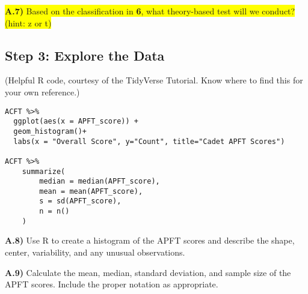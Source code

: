 \documentclass{article}
\newif\ifPrintSolution
\newcommand{\sol}[1]{\ifPrintSolution {\color{blue} #1 } \fi}
\begin{document}
\sol{Our variable of interest is APFT$\_$score, which is a quantitative variable.}

\vspace{0.2in}

\colorbox{yellow}{\textbf{A.7)} Based on the classification in \textbf{6}, what theory-based test will we conduct? (hint: z or t)}

\sol{A quantitative variable will conduct a single-mean test with the \textit{t} statistic.}

\subsection*{Step 3: Explore the Data}

(Helpful R code, courtesy of the TidyVerse Tutorial. Know where to find this for your own reference.) \color{blue}

\begin{verbatim}
ACFT %>% 
  ggplot(aes(x = APFT_score)) +
  geom_histogram()+
  labs(x = "Overall Score", y="Count", title="Cadet APFT Scores")

ACFT %>% 
    summarize(
        median = median(APFT_score),
        mean = mean(APFT_score),
        s = sd(APFT_score),
        n = n()
    )
    \end{verbatim}
\color{black}

\textbf{A.8)} Use R to create a histogram of the APFT scores and describe the shape, center, variability, and any unusual observations.

\sol{The shape appears to have two peaks split at the 300 cutoff point, which makes sense due to the grading rules. It has a mean at 304 and median at 296, indicating some right skew. Our standard deviation is 29.1, with values ranging from about 225 up to 375.}

\vspace{0.2in}

\textbf{A.9)} Calculate the mean, median, standard deviation, and sample size of the APFT scores. Include the proper notation as appropriate.

\sol{From the code above, we find that \\ 
mean = $\bar{x}$ = 304\\
median = 296 \\
standard deviation = \textit{s} = 29.1\\
sample size = \textit{n} = 293}

\vspace{0.25 in}
\end{document}
